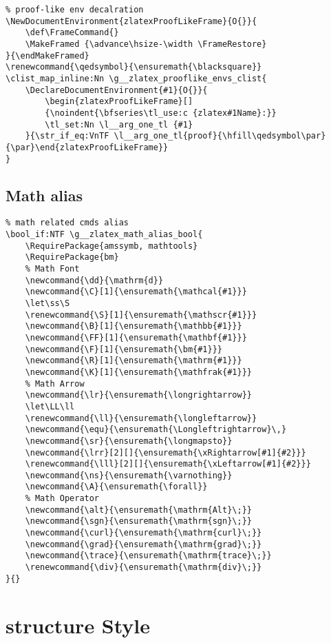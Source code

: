 \begin{verbatim}
% proof-like env decalration
\NewDocumentEnvironment{zlatexProofLikeFrame}{O{}}{
    \def\FrameCommand{}
    \MakeFramed {\advance\hsize-\width \FrameRestore}
}{\endMakeFramed}
\renewcommand{\qedsymbol}{\ensuremath{\blacksquare}}
\clist_map_inline:Nn \g__zlatex_prooflike_envs_clist{
    \DeclareDocumentEnvironment{#1}{O{}}{
        \begin{zlatexProofLikeFrame}[]
        {\noindent{\bfseries\tl_use:c {zlatex#1Name}:}}
        \tl_set:Nn \l__arg_one_tl {#1}
    }{\str_if_eq:VnTF \l__arg_one_tl{proof}{\hfill\qedsymbol\par}{\par}\end{zlatexProofLikeFrame}}
}
\end{verbatim}

\subsection{Math alias}
\begin{verbatim}
% math related cmds alias
\bool_if:NTF \g__zlatex_math_alias_bool{
    \RequirePackage{amssymb, mathtools}
    \RequirePackage{bm}          
    % Math Font 
    \newcommand{\dd}{\mathrm{d}}
    \newcommand{\C}[1]{\ensuremath{\mathcal{#1}}}
    \let\ss\S
    \renewcommand{\S}[1]{\ensuremath{\mathscr{#1}}}
    \newcommand{\B}[1]{\ensuremath{\mathbb{#1}}}
    \newcommand{\FF}[1]{\ensuremath{\mathbf{#1}}}
    \newcommand{\F}[1]{\ensuremath{\bm{#1}}}
    \newcommand{\R}[1]{\ensuremath{\mathrm{#1}}}
    \newcommand{\K}[1]{\ensuremath{\mathfrak{#1}}}
    % Math Arrow 
    \newcommand{\lr}{\ensuremath{\longrightarrow}}
    \let\LL\ll
    \renewcommand{\ll}{\ensuremath{\longleftarrow}}
    \newcommand{\equ}{\ensuremath{\Longleftrightarrow}\,}
    \newcommand{\sr}{\ensuremath{\longmapsto}}
    \newcommand{\lrr}[2][]{\ensuremath{\xRightarrow[#1]{#2}}}
    \renewcommand{\lll}[2][]{\ensuremath{\xLeftarrow[#1]{#2}}}
    \newcommand{\ns}{\ensuremath{\varnothing}}
    \newcommand{\A}{\ensuremath{\forall}}
    % Math Operator
    \newcommand{\alt}{\ensuremath{\mathrm{Alt}\;}}
    \newcommand{\sgn}{\ensuremath{\mathrm{sgn}\;}}
    \newcommand{\curl}{\ensuremath{\mathrm{curl}\;}}
    \newcommand{\grad}{\ensuremath{\mathrm{grad}\;}}
    \newcommand{\trace}{\ensuremath{\mathrm{trace}\;}}
    \renewcommand{\div}{\ensuremath{\mathrm{div}\;}}
}{}
\end{verbatim}

\section{structure Style}
